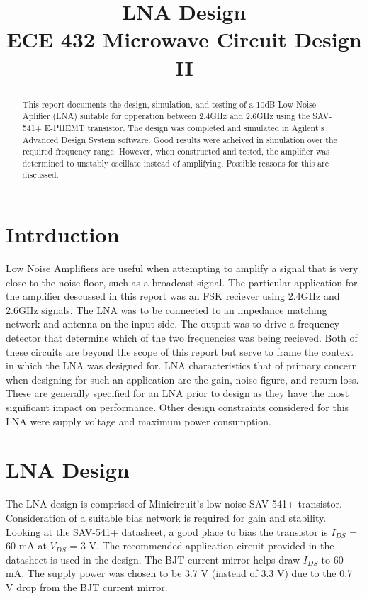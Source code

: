 \documentclass[conference]{IEEEtran}
\begin{document}
\title{LNA Design\\ECE 432 Microwave Circuit Design II}
\author{
}
\maketitle
\IEEEpeerreviewmaketitle

\begin{abstract}
This report documents the design, simulation, and testing of a 10dB Low Noise Aplifier (LNA) suitable for opperation between 2.4GHz and 2.6GHz using the SAV-541+ E-PHEMT transistor. The design was completed and simulated in Agilent's Advanced Design System software. Good results were acheived in simulation over the required frequency range. However, when constructed and tested, the amplifier was determined to unstably oscillate instead of amplifying. Possible reasons for this are discussed.
 \end{abstract}

\section{Intrduction}
Low Noise Amplifiers are useful when attempting to amplify a signal that is very close to the noise floor, such as a broadcast signal. The particular application for the amplifier descussed in this report was an FSK reciever using 2.4GHz and 2.6GHz signals. The LNA was to be connected to an impedance matching network and antenna on the input side. The output was to drive a frequency detector that determine which of the two frequencies was being recieved. Both of these circuits are beyond the scope of this report but serve to frame the context in which the LNA was designed for. LNA characteristics that of primary concern when designing for such an application are the gain, noise figure, and return loss. These are generally specified for an LNA prior to design as they have the most significant impact on performance. Other design constraints considered for this LNA were supply voltage and maximum power consumption.

\section{LNA Design}
The LNA design is comprised of Minicircuit's low noise SAV-541+ transistor.  Consideration of a suitable bias network is required for gain and stability.  Looking at the SAV-541+ datasheet\cite{sav541datasheet}, a good place to bias the transistor is $I_{DS}$ = 60 mA at $V_{DS}$ = 3 V.  The recommended application circuit provided in the datasheet is used in the design.   The BJT current mirror helps draw $I_{DS}$ to 60 mA.  The supply power was chosen to be 3.7 V (instead of 3.3 V) due to the 0.7 V drop from the BJT current mirror.
\end{document}
